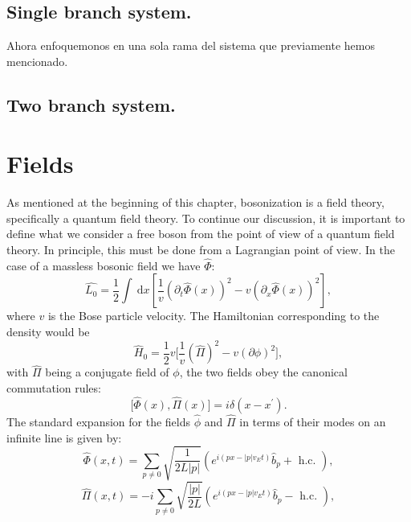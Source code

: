 \subsection{Single branch system.}
Ahora enfoquemonos en una sola rama del sistema que previamente hemos mencionado.


\subsection{Two branch system.}







\newpage
\section{Fields}
As mentioned at the beginning of this chapter, bosonization is a field theory, specifically a quantum field theory. To continue our discussion, it is important to define what we consider a free boson from the point of view of a quantum field theory. In principle, this must be done from a Lagrangian point of view. In the case of a massless bosonic field we have $\hat{\Phi}$:
\begin{equation} \label{2_2_1}
\hat{L_0}=\frac{1}{2} \int \mathrm{~d} x\left[\frac{1}{v}\left(\partial_t \hat{\Phi} (x)\right)^2-v\left(\partial_x  \hat{\Phi} (x)\right)^2\right],
\end{equation}
where $v$ is the Bose particle velocity. The Hamiltonian corresponding to the density would be
\begin{equation} \label{2_2_2}
    \hat{H}_0 = \frac{1}{2} v \big[ \frac{1}{v} (\hat{\Pi})^2
 -v(\partial \phi)^2 \big], 
\end{equation}
with $\hat{\Pi}$ being a conjugate field of $\phi$, the two fields obey the canonical commutation rules:
\begin{equation} \label{2_2_3}
    \big[ \hat{\Phi} (x), \hat{\Pi} (x) \big] = i \delta (x-x^{\prime}).
\end{equation}
The standard expansion for the fields $\hat{\phi}$ and $\hat{\Pi}$ in terms of their modes on an infinite line is given by:   
\begin{equation} \label{2_2_4}
    \hat{\Phi}(x, t)=\sum_{p \neq 0} \sqrt{\frac{1}{2 L|p|}}\left(e^{i\left(p x-|p| v_{E} t\right)} \hat{b}_{p}+\text { h.c. }\right),
\end{equation}
\begin{equation} \label{2_2_5}
   \hat{\Pi}(x, t)=-i \sum_{p \neq 0} \sqrt{\frac{|p|}{2 L}}\left(e^{i\left(p x-|p| v_{E} t\right)} \hat{b}_{p}-\text { h.c. }\right), 
\end{equation}
